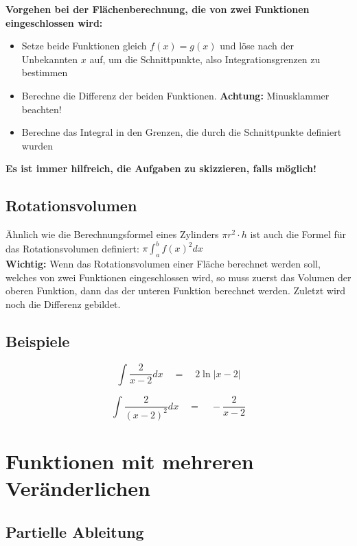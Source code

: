 \documentclass[12pt, a4paper]{scrreprt}
\begin{document}
\begin{framed}
  \textbf{Vorgehen bei der Flächenberechnung, die von zwei Funktionen eingeschlossen wird:}

  \begin{itemize}
  \item Setze beide Funktionen gleich \(f(x) = g(x)\) und löse nach der Unbekannten \(x\) auf, um die Schnittpunkte, also Integrationsgrenzen zu bestimmen
  \item Berechne die Differenz der beiden Funktionen. \textbf{Achtung:} Minusklammer beachten!
  \item Berechne das Integral in den Grenzen, die durch die Schnittpunkte definiert wurden
  \end{itemize}

  \textbf{Es ist immer hilfreich, die Aufgaben zu skizzieren, falls möglich!}
\end{framed}

\section{Rotationsvolumen}

Ähnlich wie die Berechnungsformel eines Zylinders \(\pi r^2 \cdot h\) ist auch die Formel für das Rotationsvolumen definiert: \(\pi \int_a^b f(x)^2 dx\)\\[1em]
\textbf{Wichtig:} Wenn das Rotationsvolumen einer Fläche berechnet werden soll, welches von zwei Funktionen eingeschlossen wird, so muss zuerst das Volumen der oberen Funktion, dann das der unteren Funktion berechnet werden. Zuletzt wird noch die Differenz gebildet.

\section{Beispiele}

\[
  \int \frac{2}{x - 2} dx \quad = \quad 2 \ln |x - 2|
\]

\[
  \int \frac{2}{{(x - 2)}^2} dx \quad = \quad - \frac{2}{x - 2}
\]

\chapter{Funktionen mit mehreren Veränderlichen}

\section{Partielle Ableitung}
\end{document}
